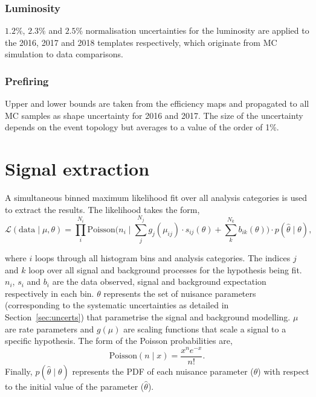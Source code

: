 \subsubsection{Luminosity}
$1.2\%$, $2.3\%$ and $2.5\%$ normalisation uncertainties for the luminosity are applied to the 2016, 2017 and 2018 templates respectively, which originate from MC simulation to data comparisons.

\subsubsection{Prefiring}
Upper and lower bounds are taken from the efficiency maps and propagated to all \ac{MC} samples as shape uncertainty for 2016 and 2017.
The size of the uncertainty depends on the event topology but averages to a value of the order of 1\%.

\section{Signal extraction}
\label{sec:sig_ext}

A simultaneous binned maximum likelihood fit over all analysis categories is used to extract the results.
The likelihood takes the form,
\begin{equation}
\mathcal{L}(\text{data}\mid\mu,\theta) = \prod_{i}^{N_{i}} \text{Poisson} \Big(n_{i} \mid \sum_{j}^{N_{j}} g_{j}(\mu_{ij}) \cdot s_{ij}(\theta) + \sum_{k}^{N_{k}} b_{ik}(\theta)\Big) \cdot p(\hat{\theta} \mid \theta),
\label{eqn:likelihood}
\end{equation}

where $i$ loops through all histogram bins and analysis categories.
The indices $j$ and $k$ loop over all signal and background processes for the hypothesis being fit.
$n_i$, $s_i$ and $b_i$ are the data observed, signal and background expectation respectively in each bin.
$\theta$ represents the set of nuisance parameters (corresponding to the systematic uncertainties as detailed in Section~\ref{sec:uncerts}) that parametrise the signal and background modelling.
$\mu$ are rate parameters and $g(\mu)$ are scaling functions that scale a signal to a specific hypothesis.
The form of the Poisson probabilities are,
\begin{equation}
\text{Poisson} (n \mid x) = \frac{x^{n}e^{-x}}{n!}.
\end{equation}
Finally, $p(\hat{\theta} \mid \theta)$ represents the \ac{PDF} of each nuisance parameter ($\theta$) with respect to the initial value of the parameter ($\hat{\theta}$). \\

